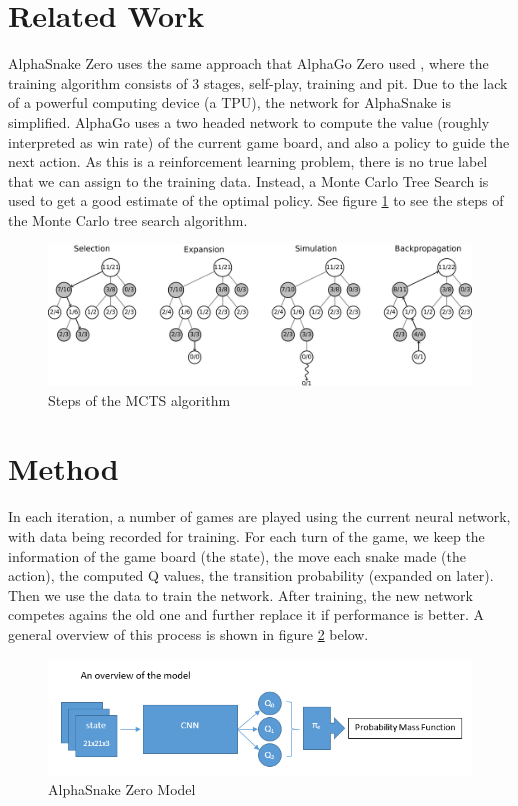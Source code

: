 ﻿\documentclass{article}
\begin{document}
\section{Related Work}

AlphaSnake Zero uses the same approach that AlphaGo Zero used
\cite{AlphaGoZeroPaper}, where the training algorithm consists of 3 stages,
self-play, training and pit. Due to the lack of a powerful computing device (a
TPU), the network for AlphaSnake is simplified. AlphaGo uses a two headed
network to compute the value (roughly interpreted as win rate) of the current
game board, and also a policy to guide the next action. As this is a
reinforcement learning problem, there is no true label that we can assign to the
training data. Instead, a Monte Carlo Tree Search is used to get a good
estimate of the optimal policy. See figure \ref{fig:mcts} to see the steps of
the Monte Carlo tree search algorithm.

\begin{figure}[!ht]
  \centering
  \includegraphics[width=12cm]{MCTS}
  \caption{Steps of the MCTS algorithm}
  \label{fig:mcts}
\end{figure}

\FloatBarrier

\section{Method}

In each iteration, a number of games are played using the current neural
network, with data being recorded for training. For each turn of the game, we keep
the information of the game board (the state), the move each snake made (the
action), the computed Q values, the transition probability (expanded on later).
Then we use the data to train the network. After training, the new network competes
agains the old one and further replace it if performance is better. A general
overview of this process is shown in figure \ref{fig:overview_of_model} below.

\begin{figure}[!ht]
  \centering
  \includegraphics[width=\linewidth]{overview_of_model}
  \caption{AlphaSnake Zero Model}
  \label{fig:overview_of_model}
\end{figure}
\end{document}
